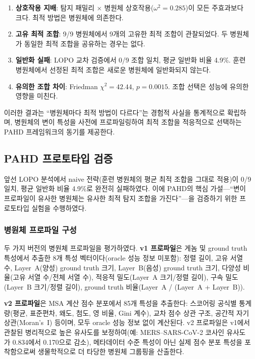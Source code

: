 \begin{enumerate}
\item \textbf{상호작용 지배}: 탐지 패밀리 $\times$ 병원체 상호작용($\omega^2 = 0.285$)이 모든 주효과보다 크다. 최적 방법은 병원체에 의존한다.
\item \textbf{고유 최적 조합}: 9/9 병원체에서 9개의 고유한 최적 조합이 관찰되었다. 두 병원체가 동일한 최적 조합을 공유하는 경우는 없다.
\item \textbf{일반화 실패}: LOPO 교차 검증에서 0/9 조합 일치, 평균 일반화 비율 4.9\%. 훈련 병원체에서 선정된 최적 조합은 새로운 병원체에 일반화되지 않는다.
\item \textbf{유의한 조합 차이}: Friedman $\chi^2 = 42.44$, $p = 0.0015$. 조합 선택은 성능에 유의한 영향을 미친다.
\end{enumerate}

이러한 결과는 ``병원체마다 최적 방법이 다르다''는 경험적 사실을 통계적으로 확립하며, 병원체의 변이 특성을 사전에 프로파일링하여 최적 조합을 적응적으로 선택하는 PAHD 프레임워크의 동기를 제공한다.


\subsection{PAHD 프로토타입 검증}
\label{subsec:pahd_prototype}


앞선 LOPO 분석에서 naive 전략(훈련 병원체의 평균 최적 조합을 그대로 적용)이 0/9 일치, 평균 일반화 비율 4.9\%로 완전히 실패하였다.
이에 PAHD의 핵심 가설---``변이 프로파일이 유사한 병원체는 유사한 최적 탐지 조합을 가진다''---을 검증하기 위한 프로토타입 실험을 수행하였다.

\subsubsection{병원체 프로파일 구성}

두 가지 버전의 병원체 프로파일을 평가하였다.
\textbf{v1 프로파일}은 게놈 및 ground truth 특성에서 추출한 8개 특성 벡터이다(oracle 성능 정보 미포함): 정렬 길이, 고유 서열 수, Layer~A(양성) ground truth 크기, Layer~B(음성) ground truth 크기, 다양성 비율(고유 서열 수/전체 서열 수), 적응적 밀도(Layer~A 크기/정렬 길이), 구속 밀도(Layer~B 크기/정렬 길이), ground truth 비율(Layer~A / (Layer~A + Layer~B)).

\textbf{v2 프로파일}은 MSA 계산 점수 분포에서 85개 특성을 추출한다: 스코어링 공식별 통계량(평균, 표준편차, 왜도, 첨도, 영 비율, Gini 계수), 교차 점수 상관 구조, 공간적 자기상관(Moran's~I) 등이며, 모두 oracle 성능 정보 없이 계산된다.
v2 프로파일은 v1에서 관찰된 병리적으로 높은 유사도를 보정하여(예: MERS--SARS-CoV-2 코사인 유사도가 0.834에서 0.170으로 감소), 메타데이터 수준 특성이 아닌 실제 점수 분포 특성을 포착함으로써 생물학적으로 더 타당한 병원체 그룹핑을 산출한다.

